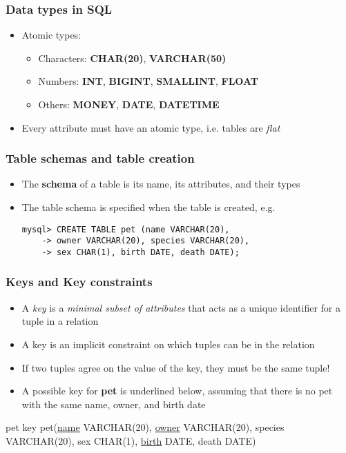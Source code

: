 \documentclass[hyperref={pdfpagelabels=false},svgnames,xcolor=table]{beamer}
\begin{document}
\begin{frame}
  \frametitle{Data types in SQL}
  \begin{itemize}
    \item Atomic types:
      \begin{itemize}
        \item Characters: \textbf{CHAR(20)}, \textbf{VARCHAR(50)}
        \item Numbers: \textbf{INT}, \textbf{BIGINT}, \textbf{SMALLINT},
          \textbf{FLOAT}
        \item Others: \textbf{MONEY}, \textbf{DATE}, \textbf{DATETIME}
      \end{itemize}
    \item Every attribute must have an atomic type, i.e. tables are \emph{flat}
  \end{itemize}
\end{frame}

\begin{frame}[fragile]
  \frametitle{Table schemas and table creation}
  \begin{itemize}
    \item The \textbf{schema} of a table is its name, its attributes, and
      their types
    \item The table schema is specified when the table is created, e.g.\ 
\begin{verbatim}
mysql> CREATE TABLE pet (name VARCHAR(20), 
    -> owner VARCHAR(20), species VARCHAR(20), 
    -> sex CHAR(1), birth DATE, death DATE);
\end{verbatim}
  \end{itemize}
\end{frame}

\begin{frame}
  \frametitle{Keys and Key constraints}
  \begin{itemize}
    \item A \emph{key} is a \emph{minimal subset of attributes} that
      acts as a unique identifier for a tuple in a relation
    \item A key is an implicit constraint on which tuples can be in the 
      relation 
    \item If two tuples agree on the value of the key, they must be the
      same tuple!
    \item A possible key for \textbf{pet} is underlined below, assuming that
      there is no pet with the same name, owner, and birth date 
  \end{itemize}
  \begin{block}{pet key}
    pet(\underline{name} VARCHAR(20), \underline{owner} VARCHAR(20), species VARCHAR(20), sex CHAR(1),
        \underline{birth} DATE, death DATE)
  \end{block}
\end{frame}
\end{document}
